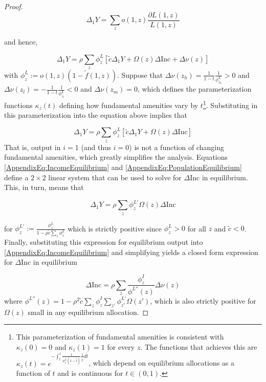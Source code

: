 \documentclass[12pt]{article}
\begin{document}
\begin{enumerate}
\begin{proof}
		 $$\Delta_{1}Y = \sum_{z}o(1, z)\frac{\partial L(1, z)}{L(1, z)}$$
		 
		and hence, 
		 
		 \begin{equation}
		 	\Delta_{1}Y =  \rho \sum_{z}\phi^{L}_{z}[ \tilde{c} \Delta_{1} Y + \Omega(z) \Delta \text{Inc} +  \Delta \nu(z)]
		 \end{equation}
		with $\phi^{L}_{z} := o(1, z)(1 - \tilde{f}(1, z))$. Suppose that $\Delta \nu(z_{h}) = \frac{1}{1 - t}\frac{1}{\phi^{L}_{z_{h}}} > 0$ and $\Delta \nu(z_{l}) = -\frac{1}{1 - t}\frac{1}{\phi^{L}_{z_{l}}} < 0$ and $\Delta \nu(z_{m}) = 0$, which defines the parameterization functions $\kappa_{z}(t)$ defining how fundamental amenities vary by $t$\footnote{This parameterization of fundamental amenities is consistent with $\kappa_{z}(0) = 0$ and $\kappa_{z}(1) = 1$ for every $z$. The functions that achieves this are $\kappa_{z}(t) = e^{-\int^{1}_{t}\frac{1}{\phi^{L}_{z}(1 - \tilde{t})}\frac{1}{\tilde{t}}d\tilde{t}}$, which depend on equilibrium allocations as a function of $t$ and is continuous for $t \in (0, 1)$.}. Substituting in this parameterization into the equation above implies that
		
		\begin{equation}\label{AppendixEq:PopulationEquilibrium}
			\Delta_{1}Y =  \rho \sum_{z}\phi^{L}_{z}[ \tilde{c} \Delta_{1} Y + \Omega(z) \Delta \text{Inc}]
		\end{equation}
		That is, output in $i = 1$ (and thus $i = 0$) is not a function of changing fundamental amenities, which greatly simplifies the analysis. Equations \eqref{AppendixEq:IncomeEquilibrium} and \eqref{AppendixEq:PopulationEquilibrium} define a $2 \times 2$ linear system that can be used to solve for $\Delta \text{Inc}$ in equilibrium. This, in turn, means that 
		
		\begin{equation*}
			\Delta_{1}Y =  \rho \sum_{z}\phi^{L'}_{z}\Omega(z) \Delta \text{Inc}
		\end{equation*}
		
		for $\phi^{L'}_{z} := \frac{\phi^{L}_{z}}{1 - \rho\tilde{c}\sum_{z}\phi^{L}_{z}}$ which is strictly positive since $\phi^{L}_{z} > 0$ for all $z$ and $\tilde{c} < 0$. Finally, substituting this expression for equilibrium output into \eqref{AppendixEq:IncomeEquilibrium} and simplifying yields a closed form expression for $\Delta \text{Inc}$ in equilibrium 
		
		\begin{equation}
			\Delta \text{Inc} = \rho \sum_{z}\frac{\phi^{I}_{z}}{\phi^{L''}(z)} \Delta \nu(z)
		\end{equation}
		 where $\phi^{L''}(z) = 1 - \rho^{2}\tilde{c}\sum_{z}\phi^{I}_{z}\sum_{z'}\phi^{L'}_{z'}\Omega(z')$, which is also strictly positive for $\Omega(z)$ small in any equilibrium allocation.
		 

\end{proof}
\end{enumerate}
\end{document}
